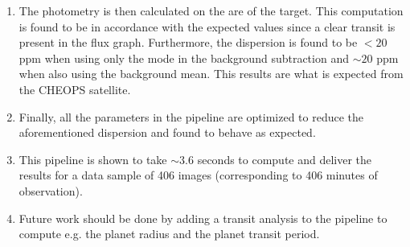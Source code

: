 \documentclass{aa}
\begin{document}
\begin{enumerate}
	\item The photometry is then calculated on the are of the target. This computation is found to be in accordance with the expected values since a clear transit is present in the flux graph. Furthermore, the dispersion is found to be $< 20$ ppm when using only the mode in the background subtraction and $\sim 20$ ppm when also using the background mean. This results are what is expected from the CHEOPS satellite.
	\item Finally, all the parameters in the pipeline are optimized to reduce the aforementioned dispersion and found to behave as expected.
	\item This pipeline is shown to take $\sim 3.6$ seconds to compute and deliver the results for a data sample of 406 images (corresponding to 406 minutes of observation).
	\item Future work should be done by adding a transit analysis to the pipeline to compute e.g. the planet radius and the planet transit period. 
\end{enumerate}


%

%
%
\end{document}
